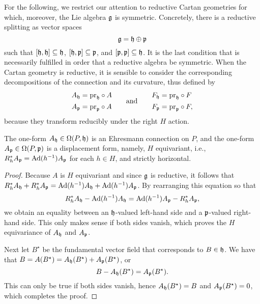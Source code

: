 \documentclass[
final,
11pt,
a4paper,
DIV=11,
headinclude=true,
footinclude=false,
bibliography=totoc,
twoside=true,  %
BCOR=5mm
]{scrbook}
\begin{document}
For the following, we restrict our attention to reductive Cartan 
geometries for which, moreover, the Lie algebra $\mathfrak{g}$ is 
symmetric. Concretely, there is a reductive splitting as vector 
spaces
\begin{equation}
  \mathfrak{g} = \mathfrak{h} \oplus \mathfrak{p}
\end{equation}
such that $[\mathfrak{h},\mathfrak{h}] \subseteq \mathfrak{h}$, $[\mathfrak{h},\mathfrak{p}] 
\subseteq \mathfrak{p}$, and $[\mathfrak{p},\mathfrak{p}] \subseteq \mathfrak{h}$. It is 
the last condition that is necessarily fulfilled in order that a 
reductive algebra be symmetric. When the Cartan geometry is 
reductive, it is sensible to consider the corresponding 
decompositions of the connection and its curvature, thus defined 
by
\begin{equation*}
\begin{split}
  A_\mathfrak{h} &= \mathrm{pr}_\mathfrak{h} \circ A \\
  A_\mathfrak{p} &= \mathrm{pr}_\mathfrak{p} \circ A
\end{split}
\quad\quad\text{and}\quad\quad
\begin{split}
  F_\mathfrak{h} &= \mathrm{pr}_\mathfrak{h} \circ F \\
  F_\mathfrak{p} &= \mathrm{pr}_\mathfrak{p} \circ F,
\end{split}
\end{equation*}
because they transform reducibly under the right $H$ action.

\begin{proposition}
\label{prop:cartan_ehres_coframe}
The one-form $A_\mathfrak{h} \in \Omega(P,\mathfrak{h})$ is an Ehresmann 
connection on $P$, and the one-form $A_\mathfrak{p} \in 
\Omega(P,\mathfrak{p})$ is a displacement form, namely, $H$ 
equivariant, i.e., $R_h^*A_\mathfrak{p} = \operatorname{Ad}(h^{-1}) A_\mathfrak{p}$ for 
each $h \in H$, and strictly horizontal.
\end{proposition}

\begin{proof}
Because $A$ is $H$ equivariant and since $\mathfrak{g}$ is reductive, 
it follows that $R_h^*A_\mathfrak{h} + R_h^*A_\mathfrak{p} = \operatorname{Ad}(h^{-1}) 
A_\mathfrak{h} + \operatorname{Ad}(h^{-1}) A_\mathfrak{p}$. By rearranging this equation so 
that
\begin{equation*}
  R_h^*A_\mathfrak{h} - \operatorname{Ad}(h^{-1})A_\mathfrak{h}
    = \operatorname{Ad}(h^{-1}) A_\mathfrak{p} - R_h^*A_\mathfrak{p},
\end{equation*}
we obtain an equality between an $\mathfrak{h}$-valued left-hand side 
and a $\mathfrak{p}$-valued right-hand side. This only makes sense if 
both sides vanish, which proves the $H$ equivariance of 
$A_\mathfrak{h}$ and $A_\mathfrak{p}$.

Next let $B^\star$ be the fundamental vector field that 
corresponds to $B \in \mathfrak{h}$. We have that $B = A(B^\star) = 
A_\mathfrak{h}(B^\star) + A_\mathfrak{p}(B^\star)$, or
\begin{equation*}
  B - A_\mathfrak{h}(B^\star) = A_\mathfrak{p}(B^\star).
\end{equation*}
This can only be true if both sides vanish, hence 
$A_\mathfrak{h}(B^\star) = B$ and $A_\mathfrak{p}(B^\star) = 0$, which 
completes the proof.
\end{proof}
\end{document}
